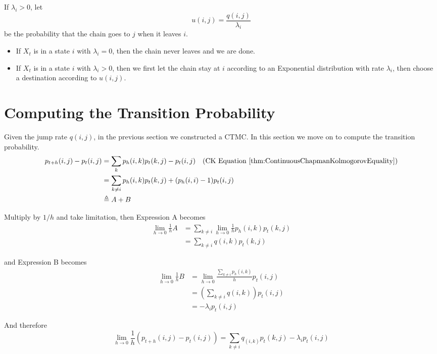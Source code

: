         If $\lambda_i > 0$, let
        \[ u(i,j) = \frac{q(i,j)}{\lambda_i} \]
        be the probability that the chain goes to $j$ when it leaves $i$.

        \begin{itemize}
            \item If $X_t$ is in a state $i$ with $\lambda_i=0$, then the chain never leaves and we are done.
            \item If $X_t$ is in a state $i$ with $\lambda_i > 0$, then we first let the chain stay at $i$ according to an Exponential distribution with rate $\lambda_i$, then choose a destination according to $u(i,j)$.
        \end{itemize}


\section{Computing the Transition Probability}
    Given the jump rate $q(i,j)$, in the previous section we constructed a CTMC. In this section we move on to compute the transition probability.
    \begin{align*}
        p_{t+h}(i,j) - p_t(i,j) &= \sum_k p_h(i,k)p_t(k,j) - p_t(i,j) \quad \text{(CK Equation \ref{thm:ContinuousChapmanKolmogorovEquality})}\\
        &= \sum_{k \neq i} p_h(i,k)p_t(k,j) + (p_h(i,i)-1)p_t(i,j)\\
        &\triangleq A + B
    \end{align*}

    Multiply by $1/h$ and take limitation, then Expression A becomes
    \begin{align*}
        \lim_{h \to 0} \frac{1}{h}A &= \sum_{k \neq i}\lim_{h \to 0}\frac{1}{h}p_h(i,k)p_t(k,j)\\
        &= \sum_{k \neq i}q(i,k)p_t(k,j)
    \end{align*}

    and Expression B becomes
    \begin{align*}
        \lim_{h \to 0} \frac{1}{h}B &= \lim_{h \to 0}\frac{\sum_{k \neq i}p_h(i,k)}{h}p_t(i,j)\\
        &= \left(\sum_{k \neq i}q(i,k)\right)p_t(i,j)\\
        &= -\lambda_i p_t(i,j)
    \end{align*}

    And therefore
    \begin{equation}\label{eq:TransitionProbabilityKeyEq}
         \lim_{h \to 0}\frac{1}{h}\left(p_{t+h}(i,j) - p_t(i,j)\right) = \sum_{k \neq i}q_(i,k)p_t(k,j) - \lambda_i p_t(i,j) 
    \end{equation}


